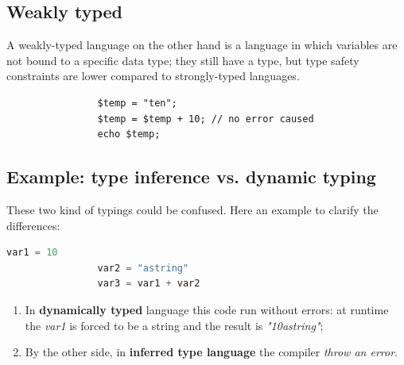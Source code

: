 \documentclass[12pt]{article}
\begin{document}
	\subsection{Weakly typed} 
		A weakly-typed language on the other hand is a language in which variables are not bound to a specific data type; they still have a type, but type safety constraints are lower compared to strongly-typed languages.\\
			\begin{lstlisting}
				$temp = "ten"; 
				$temp = $temp + 10; // no error caused
				echo $temp;
			\end{lstlisting}
			
			
		
	
		\subsection{Example: type inference vs. dynamic typing}
			These two kind of typings could be confused. Here an example to clarify the differences:

			\begin{lstlisting}[language=Python]
				var1 = 10
				var2 = "astring"
				var3 = var1 + var2
			\end{lstlisting}
			
			\begin{enumerate}
				\item In \textbf{dynamically typed} language this code run without errors: at runtime the \textit{var1} is forced to be a string and the result is \textit{"10astring"};
				\item By the other side, in \textbf{inferred type language} the compiler \textit{throw an error}.
			\end{enumerate}
\newpage
\end{document}
